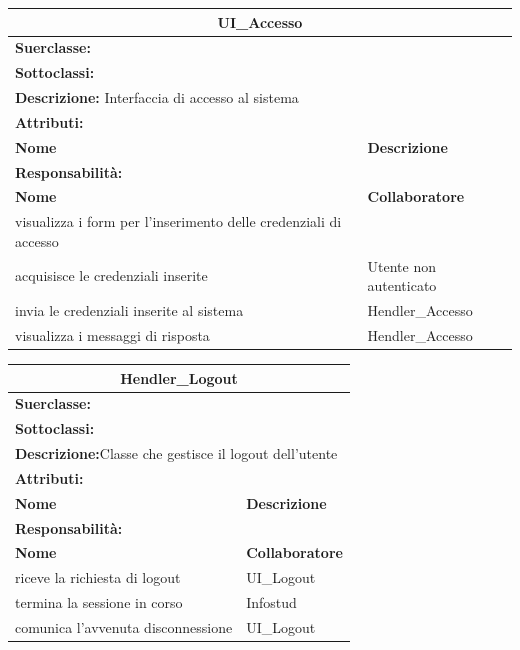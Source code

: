 \documentclass[11pt]{article}
\begin{document}
\begin{table}[H]
\centering
\begin{tabularx}{1\textwidth}{|X|X|}\hline
\multicolumn{2}{|c|}{\textbf{UI\_Accesso}}\\\hline
\multicolumn{2}{|l|}{\textbf{Suerclasse:}}\\\hline
\multicolumn{2}{|l|}{\textbf{Sottoclassi:}}\\\hline
\multicolumn{2}{|l|}{\textbf{Descrizione:} Interfaccia di accesso al sistema}\\\hline
\multicolumn{2}{|l|}{\textbf{Attributi:}}\\
\textbf{Nome} & \textbf{Descrizione}\\
\hline
\multicolumn{2}{|l|}{\textbf{Responsabilità:}}\\
\textbf{Nome} & \textbf{Collaboratore}\\
visualizza i form per l'inserimento delle credenziali di accesso & \\
acquisisce le credenziali inserite & Utente non autenticato\\
invia le credenziali inserite al sistema & Hendler\_Accesso\\
visualizza i messaggi di risposta & Hendler\_Accesso\\
\hline
\end{tabularx}
\end{table}


\begin{table}[H]
\centering
\begin{tabularx}{1\textwidth}{|X|X|}\hline
\multicolumn{2}{|c|}{\textbf{Hendler\_Logout}}\\\hline
\multicolumn{2}{|l|}{\textbf{Suerclasse:}}\\\hline
\multicolumn{2}{|l|}{\textbf{Sottoclassi:}}\\\hline
\multicolumn{2}{|l|}{\textbf{Descrizione:}Classe che gestisce il logout dell'utente}\\\hline
\multicolumn{2}{|l|}{\textbf{Attributi:}}\\
\textbf{Nome} & \textbf{Descrizione}\\
\hline
\multicolumn{2}{|l|}{\textbf{Responsabilità:}}\\
\textbf{Nome} & \textbf{Collaboratore}\\
riceve la richiesta di logout & UI\_Logout\\
termina la sessione in corso & Infostud\\
comunica l'avvenuta disconnessione & UI\_Logout\\
\hline
\end{tabularx}
\end{table}
\end{document}
